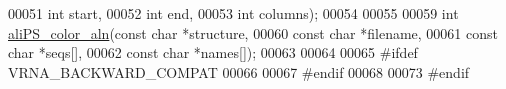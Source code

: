\begin{DoxyCode}
00051                      \textcolor{keywordtype}{int}        start,
00052                      \textcolor{keywordtype}{int}        end,
00053                      \textcolor{keywordtype}{int}        columns);
00054 
00055 
00059 \textcolor{keywordtype}{int} \hyperlink{group__plotting__utils_gaab48d4dac655d688abe921389ac2847c}{aliPS\_color\_aln}(\textcolor{keyword}{const} \textcolor{keywordtype}{char}  *structure,
00060                     \textcolor{keyword}{const} \textcolor{keywordtype}{char}  *filename,
00061                     \textcolor{keyword}{const} \textcolor{keywordtype}{char}  *seqs[],
00062                     \textcolor{keyword}{const} \textcolor{keywordtype}{char}  *names[]);
00063 
00064 
00065 \textcolor{preprocessor}{#ifdef VRNA\_BACKWARD\_COMPAT}
00066 
00067 \textcolor{preprocessor}{#endif}
00068 
00073 \textcolor{preprocessor}{#endif}
\end{DoxyCode}
